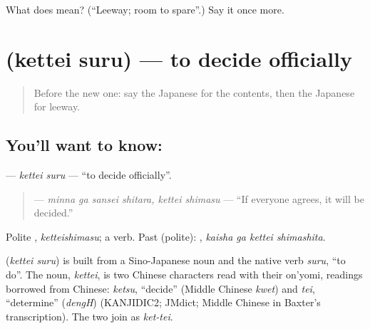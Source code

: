 \begin{tcolorbox}[breakable,colback=teal!4,colframe=teal!35!black,title={Before you move on}]
What does  mean? (\textquotedblleft{}Leeway; room to spare\textquotedblright{}.) Say it once more.
\end{tcolorbox}
\section[\texorpdfstring{\ja{けっていする} (kettei suru)}{けっていする (kettei suru)}]{ (kettei suru) — to decide officially}

\label{lesson:JA-C357-kettei-suru}



\begin{quote}
Before the new one: say the Japanese for the contents, then the Japanese for leeway.
\end{quote}

\subsection*{You'll want to know: }
\textbf{} — \emph{kettei suru} — \textquotedblleft{}to decide officially\textquotedblright{}.

\begin{quote}
\textbf{ } — \emph{minna ga sansei shitara, kettei shimasu} — \textquotedblleft{}If everyone agrees, it will be decided.\textquotedblright{}
\end{quote}

Polite \textbf{}, \emph{ketteishimasu}; a  verb. Past (polite): \textbf{ }, \emph{kaisha ga kettei shimashita}.

\begin{cousinweb}
\textbf{} (\emph{kettei suru}) is built from a Sino-Japanese noun and the native verb \emph{suru}, \textquotedblleft{}to do\textquotedblright{}. The noun, \emph{kettei}, is two Chinese characters read with their on'yomi, readings borrowed from Chinese: \emph{ketsu}, \textquotedblleft{}decide\textquotedblright{} (Middle Chinese \emph{kwet}) and \emph{tei}, \textquotedblleft{}determine\textquotedblright{} (\emph{dengH}) (KANJIDIC2; JMdict; Middle Chinese in Baxter's transcription). The two join as \emph{ket-tei}.
\end{cousinweb}

